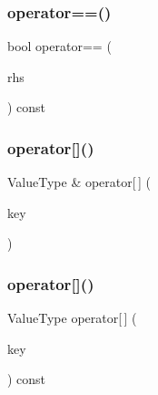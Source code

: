 \mbox{\label{classHashMap_a0d5c6ff00732460eca1d01216326c905}} 
\subsubsection{\texorpdfstring{operator==()}{operator==()}}
{\footnotesize\ttfamily bool operator== (\begin{DoxyParamCaption}\item[{const \mbox{\hyperlink{classHashMap}{Hash\+Map}}$<$ Key\+Type, Value\+Type $>$ \&}]{rhs }\end{DoxyParamCaption}) const}

\mbox{\label{classHashMap_a5bd092d78b82b4818d17917816a59730}} 
\subsubsection{\texorpdfstring{operator[]()}{operator[]()}\hspace{0.1cm}{\footnotesize\ttfamily [1/2]}}
{\footnotesize\ttfamily Value\+Type \& operator\mbox{[}$\,$\mbox{]} (\begin{DoxyParamCaption}\item[{const Key\+Type \&}]{key }\end{DoxyParamCaption})}

\mbox{\label{classHashMap_a9f52896b148cfbbc16e12ad1008971b1}} 
\subsubsection{\texorpdfstring{operator[]()}{operator[]()}\hspace{0.1cm}{\footnotesize\ttfamily [2/2]}}
{\footnotesize\ttfamily Value\+Type operator\mbox{[}$\,$\mbox{]} (\begin{DoxyParamCaption}\item[{const Key\+Type \&}]{key }\end{DoxyParamCaption}) const}

\mbox{\label{classHashMap_af0d1d70a37332cb3054fe5b1b170927c}} 
